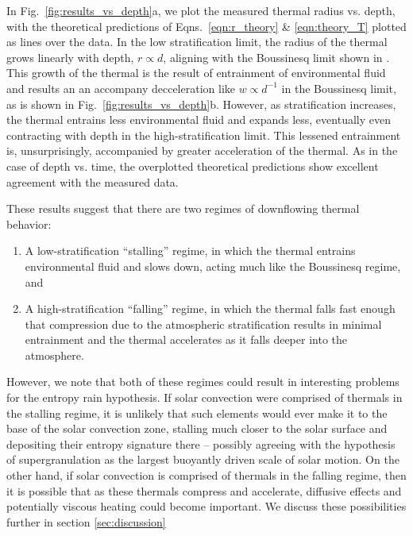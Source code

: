 \documentclass[twocolumn, amsmath, amsfonts, amssymb, trackchanges]{aastex62}
\begin{document}
In Fig.~\ref{fig:results_vs_depth}a, we plot the measured thermal radius vs. depth, with the theoretical predictions of Eqns.~\ref{eqn:r_theory} \& \ref{eqn:theory_T} plotted as lines over the data. 
In the low stratification limit, the radius of the thermal grows linearly with depth, $r \propto d$, aligning with the Boussinesq limit shown in \citet{lecoanet&jeevanjee2018}.
This growth of the thermal is the result of entrainment of environmental fluid and results an an accompany decceleration like $w \propto d^{-1}$ in the Boussinesq limit, as is shown in Fig.~\ref{fig:results_vs_depth}b.
However, as stratification increases, the thermal entrains less environmental fluid and expands less, eventually even contracting with depth in the high-stratification limit. 
This lessened entrainment is, unsurprisingly, accompanied by greater acceleration of the thermal.
As in the case of depth vs. time, the overplotted theoretical predictions show excellent agreement with the measured data.

These results suggest that there are two regimes of downflowing thermal behavior:
\begin{enumerate}
\item A low-stratification ``stalling'' regime, in which the thermal entrains environmental fluid and slows down, acting much like the Boussinesq regime, and
\item A high-stratification ``falling'' regime, in which the thermal falls fast enough that compression due to the atmospheric stratification results in minimal entrainment and the thermal accelerates as it falls deeper into the atmosphere.
\end{enumerate}
However, we note that both of these regimes could result in interesting problems for the entropy rain hypothesis. 
If solar convection were comprised of thermals in the stalling regime, it is unlikely that such elements would ever make it to the base of the solar convection zone, stalling much closer to the solar surface and depositing their entropy signature there -- possibly agreeing with the hypothesis of supergranulation as the largest buoyantly driven scale of solar motion. 
On the other hand, if solar convection is comprised of thermals in the falling regime, then it is possible that as these thermals compress and accelerate, diffusive effects and potentially viscous heating could become important. 
We discuss these possibilities further in section \ref{sec:discussion}
\end{document}
